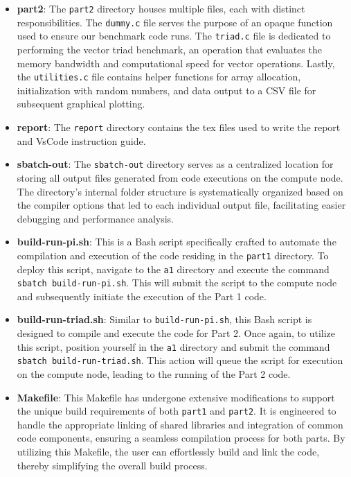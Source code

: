 \documentclass{article}
\begin{document}
\begin{multicols}{2}
\begin{itemize}
        \item \textbf{part2}: The \texttt{part2} directory houses multiple files, each with distinct responsibilities. The \texttt{dummy.c} file serves the purpose of an opaque function used to ensure our benchmark code runs. The \texttt{triad.c} file is dedicated to performing the vector triad benchmark, an operation that evaluates the memory bandwidth and computational speed for vector operations. Lastly, the \texttt{utilities.c} file contains helper functions for array allocation, initialization with random numbers, and data output to a CSV file for subsequent graphical plotting.
        \item \textbf{report}: The \texttt{report} directory contains the tex files used to write the report and VsCode instruction guide.
        \item \textbf{sbatch-out}: The \texttt{sbatch-out} directory serves as a centralized location for storing all output files generated from code executions on the compute node. The directory's internal folder structure is systematically organized based on the compiler options that led to each individual output file, facilitating easier debugging and performance analysis.
        \item \textbf{build-run-pi.sh}: This is a Bash script specifically crafted to automate the compilation and execution of the code residing in the \texttt{part1} directory. To deploy this script, navigate to the \texttt{a1} directory and execute the command \texttt{sbatch build-run-pi.sh}. This will submit the script to the compute node and subsequently initiate the execution of the Part 1 code.
        \item \textbf{build-run-triad.sh}: Similar to \texttt{build-run-pi.sh}, this Bash script is designed to compile and execute the code for Part 2. Once again, to utilize this script, position yourself in the \texttt{a1} directory and submit the command \texttt{sbatch build-run-triad.sh}. This action will queue the script for execution on the compute node, leading to the running of the Part 2 code.
        \item \textbf{Makefile}: This Makefile has undergone extensive modifications to support the unique build requirements of both \texttt{part1} and \texttt{part2}. It is engineered to handle the appropriate linking of shared libraries and integration of common code components, ensuring a seamless compilation process for both parts. By utilizing this Makefile, the user can effortlessly build and link the code, thereby simplifying the overall build process.
    \end{itemize} 
\end{multicols}
\end{document}
